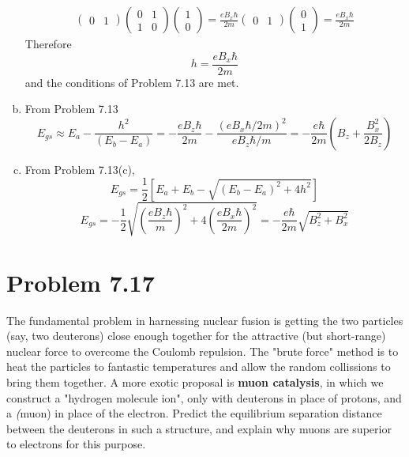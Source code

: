 \documentclass[12 pt]{article}
\numberwithin{equation}{section}
\begin{document}
\begin{enumerate}[a)]
\begin{align}
\begin{pmatrix}
        0 & 1 \end{pmatrix}
        \begin{pmatrix}
        0 & 1\\
        1 & 0
        \end{pmatrix}
        \begin{pmatrix} 
        1\\
        0
        \end{pmatrix}
       = \frac{eB_x\hbar}{2m}
      \begin{pmatrix}
        0 & 1
      \end{pmatrix}
      \begin{pmatrix}
        0\\
        1
      \end{pmatrix} = \frac{eB_x\hbar}{2m}
  \end{align}
Therefore 
\begin{equation}
  \boxed{h = \frac{eB_x\hbar}{2m}}
\end{equation}
and the conditions of Problem 7.13 are met.

\item From Problem 7.13
  \begin{equation}
    E_{gs} \approx E_a - \frac{h^2}{(E_b-E_a)} = -\frac{eB_z\hbar}{2m} - \frac{(eB_x\hbar/2m)^2}
    {eB_z\hbar/m} = \boxed{-\frac{e\hbar}{2m}\left(B_z + \frac{B_x^2}{2B_z}\right)}
  \end{equation}
\item  From Problem 7.13(c), 
\begin{equation}
  E_{gs}= \frac{1}{2}\left[E_a+E_b -\sqrt{(E_b-E_a)^2 + 4h^2}
                    \right] 
\end{equation}
\begin{equation}
  E_{gs} = -\frac{1}{2}\sqrt{\left(\frac{eB_z\hbar}{m}\right)^2 + 4\left(\frac{eB_x\hbar}{2m}
  \right)^2} = \boxed{-\frac{e\hbar}{2m}\sqrt{B_z^2+B_x^2}}
\end{equation}
\end{enumerate}


\section{Problem 7.17}
The fundamental problem in harnessing nuclear fusion is getting the two particles (say, two 
deuterons) close enough together for the attractive (but short-range) nuclear force to overcome 
the Coulomb repulsion. The "brute force" method is to heat the particles to fantastic temperatures
and allow the random collissions to bring them together. A more exotic proposal is 
\textbf{muon catalysis}, in which we construct a "hydrogen molecule ion", only with deuterons
in place of protons, and a \emph(muon) in place of the electron. Predict the equilibrium 
separation distance between the deuterons in such a structure, and explain why muons are superior
to electrons for this purpose.
\end{document}
